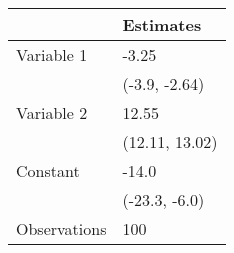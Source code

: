 \begin{tabular}{ll}
\toprule
{} &       Estimates \\
\midrule
Variable 1   &           -3.25 \\
             &   (-3.9, -2.64) \\
Variable 2   &           12.55 \\
             &  (12.11, 13.02) \\
Constant     &           -14.0 \\
             &   (-23.3, -6.0) \\
Observations &             100 \\
\bottomrule
\end{tabular}
